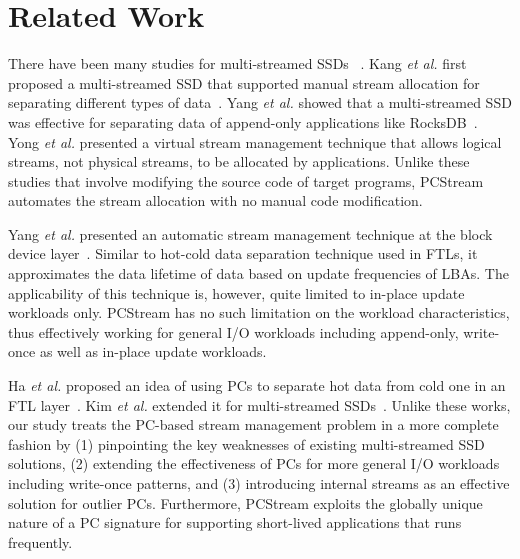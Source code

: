\vspace{-10pt}
\section{Related Work}
\vspace{-5pt}

There have been many studies for multi-streamed SSDs ~\cite{MultiStream, Level,
vStream, FStream, AutoStream, PCStream}.  Kang {\it et al.} first proposed a
multi-streamed SSD that supported manual stream allocation for separating
different types of data~\cite{MultiStream}.  Yang {\it et al.} showed that a
multi-streamed SSD was effective for separating data of append-only
applications like RocksDB~\cite{Level}.  Yong {\it et al.} presented a virtual
stream management technique that allows logical streams, not physical streams,
to be allocated by applications.  Unlike these studies that involve modifying
the source code of target programs, \textsf{\small PCStream} automates the
stream allocation with no manual code modification.

\begin{comment}
Rho {\it et al.} proposed a stream management technique, called FStream, at the
file system layer~\cite{FStream}. In FStream, metadata, journal
data, and user data that may have different lifetime characteristics were
allocated to separate streams.  Since FStream was implemented as a part of a file
system, it was not able to directly detect application's I/O behaviors.
Also, it may be hard to be deployed in practice due to 
a strong dependence on file system-specific implementation details.
\textsf{\small PCStream}, on the other hand, efficiently exploits
programs' I/O behaviors using PCs with no file system-specific modifications.
\end{comment}

Yang {\it et al.} presented an automatic stream management technique at the
block device layer~\cite{AutoStream}. Similar to hot-cold data separation
technique used in FTLs, it approximates the data lifetime of data based on
update frequencies of LBAs.  The applicability of this technique is, however,
quite limited to in-place update workloads only.  \textsf{\small PCStream} has
no such limitation on the workload characteristics, thus effectively working
for general I/O workloads including append-only, write-once 
as well as in-place update workloads.

Ha {\it et al.} proposed an idea of using PCs to separate hot data from cold
one in an FTL layer~\cite{PCHa}.  Kim {\it et al.} extended it for
multi-streamed SSDs~\cite{PCStream}.  Unlike these works, our study treats the
PC-based stream management problem in a more complete fashion by (1)
pinpointing the key weaknesses of existing multi-streamed SSD solutions, (2)
extending the effectiveness of PCs for more general I/O workloads including
write-once patterns, and (3) introducing internal streams as an effective
solution for outlier PCs.  Furthermore, \textsf{\small PCStream} exploits the
globally unique nature of a PC signature for supporting short-lived
applications that runs frequently.

